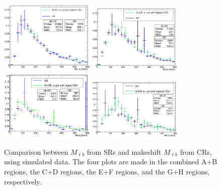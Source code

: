 \begin{figure}[htbp]
\centering
\includegraphics[width=0.4\textwidth]{figures/cr0b_Mlbshape_AB.png}
\includegraphics[width=0.4\textwidth]{figures/cr0b_Mlbshape_CD.png}
\includegraphics[width=0.4\textwidth]{figures/cr0b_Mlbshape_EF.png}
\includegraphics[width=0.4\textwidth]{figures/cr0b_Mlbshape_GH.png}
\caption{Comparison between $M_{\ell b}$ from SRs and makeshift $M_{\ell
    b}$ from CRs, using simulated data. The four plots are made in the
  combined A+B regions, the C+D regions, the E+F regions, and the G+H
  regions, respectively.}
\label{fig:stop:1lw:mlb}
\end{figure}

